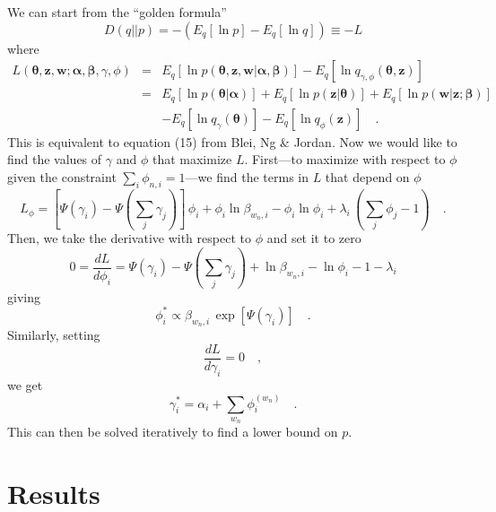 \documentclass[11pt]{article}
\newcommand{\bvec}[1]{\ensuremath{\boldsymbol{#1}}}
\newcommand{\tha}{\bvec{\theta}}
\newcommand{\z}{\bvec{z}}
\newcommand{\w}{\bvec{w}}
\newcommand{\ala}{\bvec{\alpha}}
\newcommand{\ba}{\bvec{\beta}}
\begin{document}
We can start from the ``golden formula''
\begin{equation}
    D (q || p) = - \left ( E_q [\ln p] - E_q [\ln q] \right ) \equiv - L
\end{equation}
where
\begin{eqnarray}
    L (\tha, \z, \w; \ala, \ba, \gamma, \phi) & = &
        E_q [\ln p(\tha, \z, \w | \ala, \ba)]
        - E_q [\ln q_{\gamma, \phi} (\tha, \z)] \nonumber \\
        & = & E_q [\ln p (\tha | \ala)] + E_q [\ln p (\z | \tha)]
        + E_q [\ln p (\w | \z; \ba)] \nonumber \\
        && - E_q [\ln q_\gamma (\tha)]
        - E_q \left [\ln q_{\phi} (\z)  \right ] \quad . \nonumber
\end{eqnarray}
This is equivalent to equation (15) from Blei, Ng \& Jordan.
Now we would like to find the values of $\gamma$ and $\phi$ that maximize
$L$. First---to maximize with respect to $\phi$ given the constraint
$\sum_i \phi_{n,i} = 1$---we find the terms in $L$ that depend on $\phi$
\begin{equation}
    L_\phi = \left [ \Psi(\gamma_i) - \Psi \left (\sum_j \gamma_j \right )
    \right ] \, \phi_i
        + \phi_i \ln \beta_{w_n, i} - \phi_i \ln \phi_i
        + \lambda_i \, \left ( \sum_j \phi_j - 1 \right ) \quad .
\end{equation}
Then, we take the derivative with respect to $\phi$ and set it to zero
\begin{equation}
    0 = \frac{dL}{d\phi_i} = \Psi(\gamma_i) -
        \Psi \left (\sum_j \gamma_j \right ) + \ln \beta_{w_n, i} - \ln \phi_i
        - 1 - \lambda_i
\end{equation}
giving
\begin{equation}
    \phi_i^* \propto \beta_{w_n, i} \, \exp \left [ \Psi(\gamma_i) \right ]
    \quad .
\end{equation}
Similarly, setting
\begin{equation}
    \frac{dL}{d\gamma_i} = 0 \quad ,
\end{equation}
we get
\begin{equation}
    \gamma_i^* = \alpha_i + \sum_{w_n} \phi_i^{(w_n)} \quad .
\end{equation}
This can then be solved iteratively to find a lower bound on $p$.

\section{Results} \label{sect:res}
\end{document}
